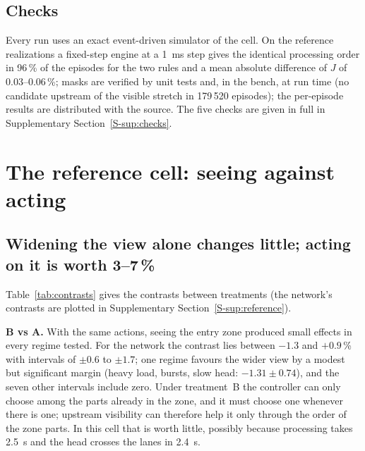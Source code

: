 \documentclass[11pt,a4paper]{article}
\newcommand{\nj}{\textsc{nj}}
\newcommand{\supsec}[1]{Supplementary Section~\ref{S-#1}}
\begin{document}
\subsection{Checks}
Every run uses an exact event-driven simulator of the cell. On the reference realizations
a fixed-step engine at a 1~ms step gives the identical processing order in 96\,\% of the
episodes for the two rules and a mean absolute difference of $J$ of 0.03--0.06\,\%; masks
are verified by unit tests and, in the bench, at run time (no candidate upstream of the
visible stretch in 179\,520 episodes); the per-episode results are distributed with the
source. The five checks are given in full in \supsec{sup:checks}.

\section{The reference cell: seeing against acting}\label{sec:reference}

\subsection{Widening the view alone changes little; acting on it is worth 3--7\,\%}\label{sec:seeing}
Table~\ref{tab:contrasts} gives the contrasts between treatments (the network's contrasts
are plotted in \supsec{sup:reference}).

\begin{table}[t]
\centering\small
\caption{Reference cell: contrasts between treatments (paired $\Delta$ of the penalized
flow time, \%, 95\,\% CI; in parentheses the realizations, out of 30, in which the
first-named treatment is cheaper; bold: the interval excludes zero). For \nj\ the
contrasts B vs A and D vs B are zero by construction (arrival-time tie-break). Seeds
7000--7029, shared with the companion paper.}
\label{tab:contrasts}
\resizebox{\linewidth}{!}{}
\end{table}

\textbf{B vs A.} With the same actions, seeing the entry zone produced small effects in
every regime tested. For the network the contrast lies between $-1.3$ and $+0.9$\,\%
with intervals of $\pm0.6$ to $\pm1.7$; one regime favours the wider view by a modest but
significant margin (heavy load, bursts, slow head: $-1.31\pm0.74$), and the seven other
intervals include zero. Under treatment~B the controller can only choose among the parts
already in the zone, and it must choose one whenever there is one; upstream visibility
can therefore help it only through the order of the zone parts. In this cell that is worth
little, possibly because processing takes 2.5~s and the head crosses the lanes in 2.4~s.
\end{document}
